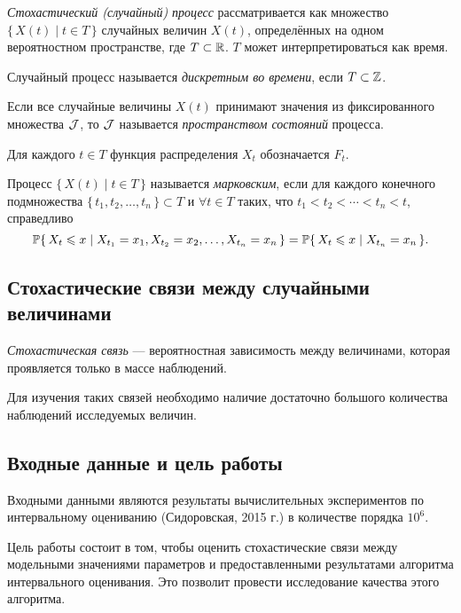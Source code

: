 \emph{Стохастический (случайный) процесс} рассматривается как множество $\{\, X(t) \mid t \in T \,\}$ случайных величин $X(t)$, определённых на одном вероятностном пространстве, где $T \subset \R$. $T$ может интерпретироваться как время.
\begin{define}
	Случайный процесс называется \emph{дискретным во времени}, если $T \subset \Z$.
\end{define}
\begin{define}
 	Если все случайные величины $X(t)$ принимают значения из фиксированного множества $\J$, то $\J$ называется \emph{пространством состояний} процесса.
\end{define}
Для каждого $t \in T$ функция распределения $X_t$ обозначается $F_t$.
\begin{define}
	Процесс $\{\, X(t) \mid t \in T \,\}$ называется \emph{марковским}, если для каждого конечного подмножества $\{\, t_1, t_2, \ldots, t_n \,\} \subset T$ и $\forall t \in T$ таких, что $t_1 < t_2 < \cdots < t_n < t$, справедливо
\[
\P\{\, X_t \leqslant x \mid X_{t_1} = x_1, X_{t_2} = x_2, \ldots, X_{t_n} = x_n \,\} = \P\{\, X_t \leqslant x \mid X_{t_n} = x_n \,\}.
\]
\end{define}

\subsection*{Стохастические связи между случайными величинами}

\begin{define}
\emph{Стохастическая связь} --- вероятностная зависимость между величинами, которая проявляется только в массе наблюдений.
\end{define}

Для изучения таких связей необходимо наличие достаточно большого количества наблюдений исследуемых величин.

\subsection*{Входные данные и цель работы}

Входными данными являются результаты вычислительных экспериментов по интервальному оцениванию (Сидоровская, 2015 г.) в количестве порядка $10^6$.

Цель работы состоит в том, чтобы оценить стохастические связи между модельными значениями параметров и предоставленными результатами алгоритма интервального оценивания. Это позволит провести исследование качества этого алгоритма.

